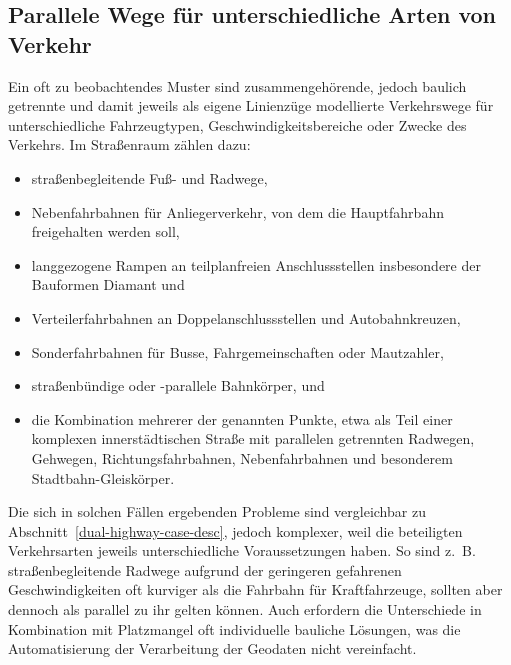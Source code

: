\documentclass[../main/thesis.tex]{subfiles}
\begin{document}


\subsection{Parallele Wege für unterschiedliche Arten von Verkehr}

Ein oft zu beobachtendes Muster sind zusammengehörende, jedoch baulich getrennte und damit jeweils als eigene Linienzüge modellierte Verkehrswege für unterschiedliche Fahrzeugtypen, Geschwindigkeitsbereiche oder Zwecke des Verkehrs.
Im Straßenraum zählen dazu:

\begin{itemize}
	\item straßenbegleitende Fuß- und Radwege,
	\item Nebenfahrbahnen  für Anliegerverkehr, von dem die Hauptfahrbahn freigehalten werden soll,
	\item langgezogene Rampen an teilplanfreien Anschlussstellen insbesondere der Bauformen Diamant und 
	\item Verteilerfahrbahnen an Doppelanschlussstellen und Autobahnkreuzen,
	\item Sonderfahrbahnen für Busse, Fahrgemeinschaften oder Mautzahler,
	\item straßenbündige oder -parallele Bahnkörper, und
	\item die Kombination mehrerer der genannten Punkte, etwa als Teil einer komplexen innerstädtischen Straße mit parallelen getrennten Radwegen, Gehwegen, Richtungsfahrbahnen, Nebenfahrbahnen und besonderem Stadtbahn-Gleiskörper.
\end{itemize}

Die sich in solchen Fällen ergebenden Probleme sind vergleichbar zu Abschnitt~\ref{dual-highway-case-desc}, jedoch komplexer, weil die beteiligten Verkehrsarten jeweils unterschiedliche Voraussetzungen haben.
So sind z.~B. straßenbegleitende Radwege aufgrund der geringeren gefahrenen Geschwindigkeiten oft kurviger als die Fahrbahn für Kraftfahrzeuge, sollten aber dennoch als parallel zu ihr gelten können.
Auch erfordern die Unterschiede in Kombination mit Platzmangel oft individuelle bauliche Lösungen, was die Automatisierung der Verarbeitung der Geodaten nicht vereinfacht.
\end{document}
